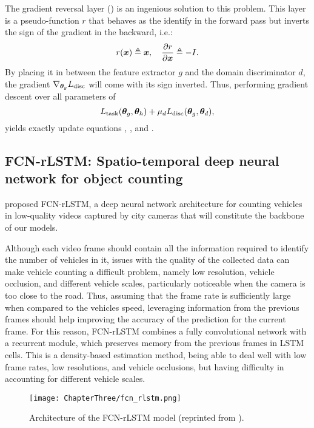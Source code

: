 The gradient reversal layer (\citet{Ganin2015}) is an ingenious solution to this problem. This layer is a pseudo-function $r$ that behaves as the identify in the forward pass but inverts the sign of the gradient in the backward, i.e.:
\begin{equation}
	r({\bm{x}}) \triangleq {\bm{x}}, \quad \frac{\partial r}{\partial {\bm{x}}} \triangleq -I.
\end{equation}
By placing it in between the feature extractor $g$ and the domain discriminator $d$, the gradient $\nabla_{{\bm{\theta}}_g} L_{\text{disc}}$ will come with its sign inverted. Thus, performing gradient descent over all parameters of
\begin{equation}
	L_{\text{task}}({\bm{\theta}}_g, {\bm{\theta}}_h) + \mu_d L_{\text{disc}}({\bm{\theta}}_g, {\bm{\theta}}_d),
\end{equation}
yields exactly update equations , , and .

\subsection{FCN-rLSTM: Spatio-temporal deep neural network for object counting}
\label{sec:da_sensors_fcn_rltsm}

\citet{Zhang2017} proposed FCN-rLSTM, a deep neural network architecture for counting vehicles in low-quality videos captured by city cameras that will constitute the backbone of our models. 

Although each video frame should contain all the information required to identify the number of vehicles in it, issues with the quality of the collected data can make vehicle counting a difficult problem, namely low resolution, vehicle occlusion, and different vehicle scales, particularly noticeable when the camera is too close to the road. Thus, assuming that the frame rate is sufficiently large when compared to the vehicles speed, leveraging information from the previous frames should help improving the accuracy of the prediction for the current frame. For this reason, FCN-rLSTM combines a fully convolutional network with a recurrent module, which preserves memory from the previous frames in LSTM cells. This is a density-based estimation method, being able to deal well with low frame rates, low resolutions, and vehicle occlusions, but having difficulty in accounting for different vehicle scales.

\begin{figure}
	\centering
	\texttt{[image: ChapterThree/fcn\_rlstm.png]}
	\caption{Architecture of the FCN-rLSTM model (reprinted from \citet{Zhang2017}).}
	\label{fig:fcn_rlstm}
\end{figure}

